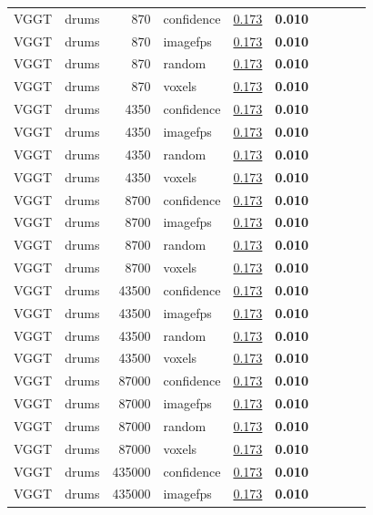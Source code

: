 \begin{table}[H]
\begin{tabular}{llrlrrrrrr}
VGGT & drums & 870 & confidence & \underline{0.173} & \textbf{0.010} &  &  &  &  \\
VGGT & drums & 870 & imagefps & \underline{0.173} & \textbf{0.010} &  &  &  &  \\
VGGT & drums & 870 & random & \underline{0.173} & \textbf{0.010} &  &  &  &  \\
VGGT & drums & 870 & voxels & \underline{0.173} & \textbf{0.010} &  &  &  &  \\
VGGT & drums & 4350 & confidence & \underline{0.173} & \textbf{0.010} &  &  &  &  \\
VGGT & drums & 4350 & imagefps & \underline{0.173} & \textbf{0.010} &  &  &  &  \\
VGGT & drums & 4350 & random & \underline{0.173} & \textbf{0.010} &  &  &  &  \\
VGGT & drums & 4350 & voxels & \underline{0.173} & \textbf{0.010} &  &  &  &  \\
VGGT & drums & 8700 & confidence & \underline{0.173} & \textbf{0.010} &  &  &  &  \\
VGGT & drums & 8700 & imagefps & \underline{0.173} & \textbf{0.010} &  &  &  &  \\
VGGT & drums & 8700 & random & \underline{0.173} & \textbf{0.010} &  &  &  &  \\
VGGT & drums & 8700 & voxels & \underline{0.173} & \textbf{0.010} &  &  &  &  \\
VGGT & drums & 43500 & confidence & \underline{0.173} & \textbf{0.010} &  &  &  &  \\
VGGT & drums & 43500 & imagefps & \underline{0.173} & \textbf{0.010} &  &  &  &  \\
VGGT & drums & 43500 & random & \underline{0.173} & \textbf{0.010} &  &  &  &  \\
VGGT & drums & 43500 & voxels & \underline{0.173} & \textbf{0.010} &  &  &  &  \\
VGGT & drums & 87000 & confidence & \underline{0.173} & \textbf{0.010} &  &  &  &  \\
VGGT & drums & 87000 & imagefps & \underline{0.173} & \textbf{0.010} &  &  &  &  \\
VGGT & drums & 87000 & random & \underline{0.173} & \textbf{0.010} &  &  &  &  \\
VGGT & drums & 87000 & voxels & \underline{0.173} & \textbf{0.010} &  &  &  &  \\
VGGT & drums & 435000 & confidence & \underline{0.173} & \textbf{0.010} &  &  &  &  \\
VGGT & drums & 435000 & imagefps & \underline{0.173} & \textbf{0.010} &  &  &  &  \\

\end{tabular}
\end{table}
